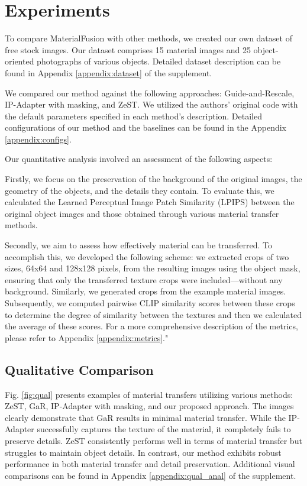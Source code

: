 \section{Experiments}
To compare MaterialFusion with other methods, we created our own dataset of free stock images. Our dataset comprises 15 material images and 25 object-oriented photographs of various objects. Detailed dataset description can be found in Appendix \ref{appendix:dataset} of the supplement. 

We compared our method against the following approaches: Guide-and-Rescale, IP-Adapter with masking, and ZeST. We utilized the authors' original code with the default parameters specified in each method's description.  Detailed configurations of our method and the baselines can be found in the Appendix \ref{appendix:configs}.

Our quantitative analysis involved an assessment of the following aspects:

Firstly, we focus on the preservation of the background of the original images, the geometry of the objects, and the details they contain. To evaluate this, we calculated the Learned Perceptual Image Patch Similarity (LPIPS) \cite{zhang2018unreasonable} between the original object images and those obtained through various material transfer methods.

Secondly, we aim to assess how effectively material can be transferred. To accomplish this, we developed the following scheme: we extracted crops of two sizes, 64x64 and 128x128 pixels, from the resulting images using the object mask, ensuring that only the transferred texture crops were included—without any background. Similarly, we generated crops from the example material images. 
Subsequently, we computed pairwise CLIP similarity scores between these crops to determine the degree of similarity between the textures and then we calculated the average of these scores. 
For a more comprehensive description of the metrics, please refer to Appendix \ref{appendix:metrics}."


\subsection{Qualitative Comparison}
Fig. \ref{fig:qual} presents examples of material transfers utilizing various methods: ZeST, GaR, IP-Adapter with masking, and our proposed approach. The images clearly demonstrate that GaR results in minimal material transfer. While the IP-Adapter successfully captures the texture of the material, it completely fails to preserve details. ZeST consistently performs well in terms of material transfer but struggles to maintain object details. In contrast, our method exhibits robust performance in both material transfer and detail preservation. Additional visual comparisons can be found in Appendix \ref{appendix:qual_anal} of the supplement.


